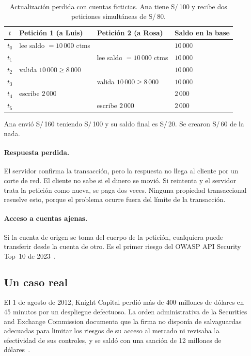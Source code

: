 \begin{table}[htbp]
\centering
\caption{Actualización perdida con cuentas ficticias. Ana tiene S/\,100 y
recibe dos peticiones simultáneas de S/\,80.}
\label{tab:lostupdate}
\small
\begin{tabular}{@{}clll@{}}
\toprule
$t$ & Petición 1 (a Luis) & Petición 2 (a Rosa) & Saldo en la base \\
\midrule
$t_0$ & lee saldo $=10\,000$ ctms & & $10\,000$ \\
$t_1$ & & lee saldo $=10\,000$ ctms & $10\,000$ \\
$t_2$ & valida $10\,000 \geq 8\,000$ & & $10\,000$ \\
$t_3$ & & valida $10\,000 \geq 8\,000$ & $10\,000$ \\
$t_4$ & escribe $2\,000$ & & $2\,000$ \\
$t_5$ & & escribe $2\,000$ & $2\,000$ \\
\bottomrule
\end{tabular}

\vspace{0.4em}
{\footnotesize Ana envió S/\,160 teniendo S/\,100 y su saldo final es S/\,20.
Se crearon S/\,60 de la nada.}
\end{table}

\paragraph{Respuesta perdida.} El servidor confirma la transacción, pero la
respuesta no llega al cliente por un corte de red. El cliente no sabe si el
dinero se movió. Si reintenta y el servidor trata la petición como nueva, se
paga dos veces. Ninguna propiedad transaccional resuelve esto, porque el
problema ocurre fuera del límite de la transacción.

\paragraph{Acceso a cuentas ajenas.} Si la cuenta de origen se toma del cuerpo
de la petición, cualquiera puede transferir desde la cuenta de otro. Es el
primer riesgo del OWASP API Security Top~10 de 2023~\cite{owaspapi2023}.

\subsection{Un caso real}

El 1 de agosto de 2012, Knight Capital perdió más de 400 millones de dólares
en 45 minutos por un despliegue defectuoso. La orden administrativa de la
Securities and Exchange Commission documenta que la firma no disponía de
salvaguardas adecuadas para limitar los riesgos de su acceso al mercado ni
revisaba la efectividad de sus controles, y se saldó con una sanción de 12
millones de dólares~\cite{sec2013knight}.

